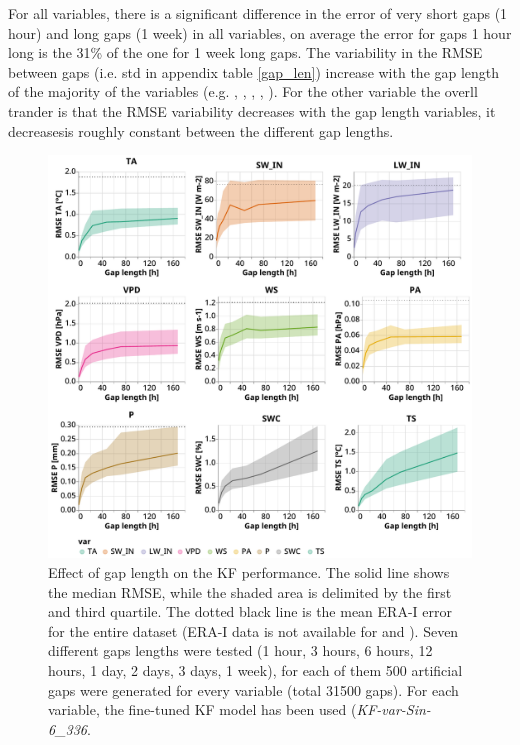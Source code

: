 \documentclass{article}
\newcommand{\imgwidth}{6in}
\begin{document}
For all variables, there is a significant difference in the error of very short gaps (1 hour) and long gaps (1 week) in all variables, on average the error for gaps 1 hour long is the 31\% of the one for 1 week long gaps.
The variability in the RMSE between gaps (i.e. std in appendix table \ref{gap_len}) increase with the gap length of the majority of the variables (e.g. , , , , ). For the other variable the overll trander is that the RMSE variability decreases with the gap length variables, it decreasesis roughly constant between the different gap lengths.

\begin{figure}
\centerline{\includegraphics[width=\imgwidth]{gap_len}}
\caption{Effect of gap length on the KF performance. The solid line shows the median RMSE, while the shaded area is delimited by the first and third quartile. The dotted black line is the mean ERA-I error for the entire dataset (ERA-I data is not available for  and ). Seven different gaps lengths were tested (1 hour, 3 hours, 6 hours, 12 hours, 1 day, 2 days, 3 days, 1 week), for each of them 500 artificial gaps were generated for every variable (total 31500 gaps). For each variable, the fine-tuned KF model has been used (\textit{KF-\textlangle var\textrangle-Sin-6\_336}.}
\label{fig:gap_len}
\end{figure}
\end{document}
